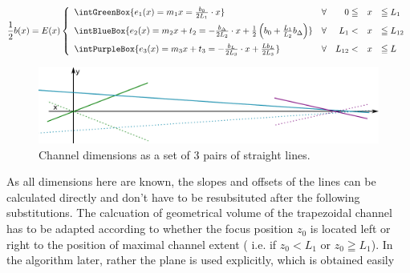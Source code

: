 \begin{align}
  \frac{1}{2}b(x) = E(x) \left\{  
  \begin{array}{lcrcl}
    \intGreenBox {\ensuremath{ e_1(x) = m_1 x       = \frac{b_0}{2L_1} \cdot x   }}
    & \forall & 0 \leqq & x &\leqq L_1 \\\addlinespace %
    \intBlueBox {\ensuremath{ e_2(x) = m_2 x + t_2  = - \frac{\bDelta}{2 L_2} \cdot x  + \frac{1}{2} \left( b_0 +  \frac{L_1}{L_2}\bDelta \right)     }}
    & \forall & L_1 < & x &\leqq L_{12}  \\\addlinespace  %
    \intPurpleBox {\ensuremath{ e_3(x) = m_3 x + t_3  = - \frac{\bL}{2L_3}  \cdot x + \frac{L \bL}{2 L_3 } }}
    & \forall & L_{12} < & x &\leqq L   \\ %
  \end{array}
  \right.
  \label{eq:chLine}
\end{align}
\begin{figure}  
  \begin{center}
    \includegraphics[width=\linewidth]{./images/fffChannelCoordSys.pdf}    
  \end{center}
  \caption[Channel dimensions as a set of straight lines]{Channel dimensions as a set of 3 pairs of straight lines.}
  \label{fig:fffChannelCoordSys} 
\end{figure}
As all dimensions here are known, the slopes and offsets of the lines can be calculated directly and don't have to be resubsituted after the following substitutions.
The calcuation of geometrical volume of the trapezoidal channel has to be adapted according to whether the focus 
position $z_0$ is located left or right to the position of maximal channel extent ( i.e. if $z_0 < L_1$ or $z_0 \geqq 
L_1$). In the algorithm later, rather the plane is used explicitly, which is obtained easily \clearpage
